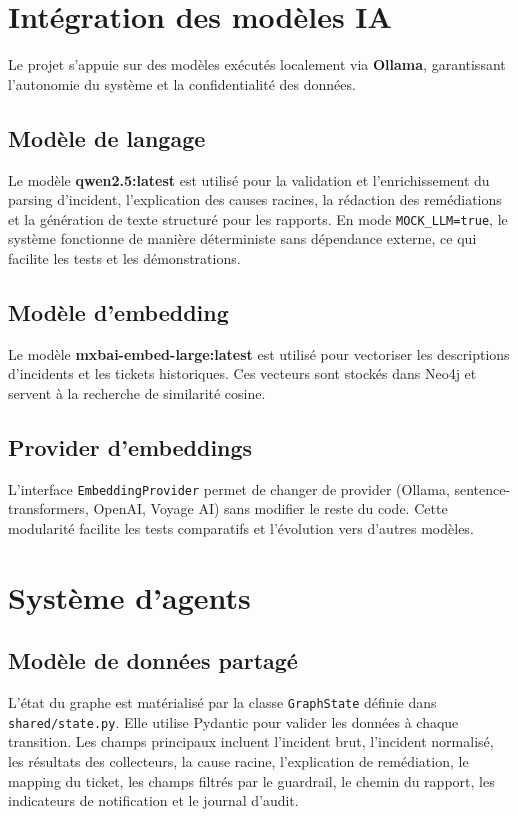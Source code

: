 \section{Intégration des modèles IA}
Le projet s'appuie sur des modèles exécutés localement via \textbf{Ollama}, garantissant l'autonomie du système et la confidentialité des données.

\subsection{Modèle de langage}
Le modèle \textbf{qwen2.5:latest} est utilisé pour la validation et l'enrichissement du parsing d'incident, l'explication des causes racines, la rédaction des remédiations et la génération de texte structuré pour les rapports. En mode \texttt{MOCK\_LLM=true}, le système fonctionne de manière déterministe sans dépendance externe, ce qui facilite les tests et les démonstrations.

\subsection{Modèle d'embedding}
Le modèle \textbf{mxbai-embed-large:latest} est utilisé pour vectoriser les descriptions d'incidents et les tickets historiques. Ces vecteurs sont stockés dans Neo4j et servent à la recherche de similarité cosine.

\subsection{Provider d'embeddings}
L'interface \texttt{EmbeddingProvider} permet de changer de provider (Ollama, sentence-transformers, OpenAI, Voyage AI) sans modifier le reste du code. Cette modularité facilite les tests comparatifs et l'évolution vers d'autres modèles.

\section{Système d'agents}

\subsection{Modèle de données partagé}
L'état du graphe est matérialisé par la classe \texttt{GraphState} définie dans \texttt{shared/state.py}. Elle utilise Pydantic pour valider les données à chaque transition. Les champs principaux incluent l'incident brut, l'incident normalisé, les résultats des collecteurs, la cause racine, l'explication de remédiation, le mapping du ticket, les champs filtrés par le guardrail, le chemin du rapport, les indicateurs de notification et le journal d'audit.

